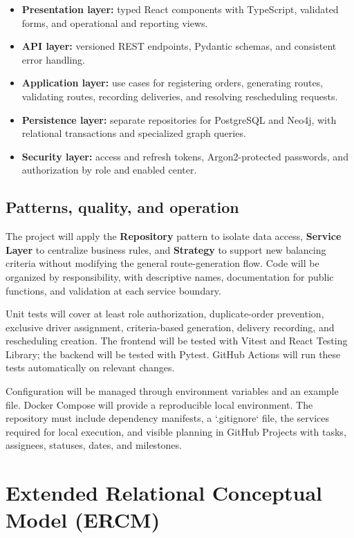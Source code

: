 \documentclass[12pt,a4paper]{article}
\begin{document}
\begin{itemize}
\item \textbf{Presentation layer:} typed React components with TypeScript, validated forms, and operational and reporting views.
\item \textbf{API layer:} versioned REST endpoints, Pydantic schemas, and consistent error handling.
\item \textbf{Application layer:} use cases for registering orders, generating routes, validating routes, recording deliveries, and resolving rescheduling requests.
\item \textbf{Persistence layer:} separate repositories for PostgreSQL and Neo4j, with relational transactions and specialized graph queries.
\item \textbf{Security layer:} access and refresh tokens, Argon2-protected passwords, and authorization by role and enabled center.
\end{itemize}

\subsection{Patterns, quality, and operation}
The project will apply the \textbf{Repository} pattern to isolate data access, \textbf{Service Layer} to centralize business rules, and \textbf{Strategy} to support new balancing criteria without modifying the general route-generation flow. Code will be organized by responsibility, with descriptive names, documentation for public functions, and validation at each service boundary.

Unit tests will cover at least role authorization, duplicate-order prevention, exclusive driver assignment, criteria-based generation, delivery recording, and rescheduling creation. The frontend will be tested with Vitest and React Testing Library; the backend will be tested with Pytest. GitHub Actions will run these tests automatically on relevant changes.

Configuration will be managed through environment variables and an example file. Docker Compose will provide a reproducible local environment. The repository must include dependency manifests, a `.gitignore` file, the services required for local execution, and visible planning in GitHub Projects with tasks, assignees, statuses, dates, and milestones.

\section{Extended Relational Conceptual Model (ERCM)}
\end{document}

